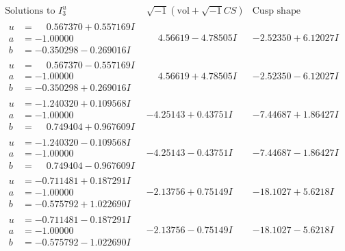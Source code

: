 \documentclass[1p]{elsarticle_modified}
\theoremstyle{definition}
\newcommand{\I}{\sqrt{-1}}
\begin{document}
$$\begin{array}{c|c|c}  
\text{Solutions to }I^u_{3}& \I (\text{vol} + \sqrt{-1}CS) & \text{Cusp shape}\\
 \hline 
\begin{aligned}
u &= \phantom{-}0.567370 + 0.557169 I \\
a &= -1.00000\phantom{ +0.000000I} \\
b &= -0.350298 - 0.269016 I\end{aligned}
 & \phantom{-}4.56619 - 4.78505 I & -2.52350 + 6.12027 I \\ \hline\begin{aligned}
u &= \phantom{-}0.567370 - 0.557169 I \\
a &= -1.00000\phantom{ +0.000000I} \\
b &= -0.350298 + 0.269016 I\end{aligned}
 & \phantom{-}4.56619 + 4.78505 I & -2.52350 - 6.12027 I \\ \hline\begin{aligned}
u &= -1.240320 + 0.109568 I \\
a &= -1.00000\phantom{ +0.000000I} \\
b &= \phantom{-}0.749404 + 0.967609 I\end{aligned}
 & -4.25143 + 0.43751 I & -7.44687 + 1.86427 I \\ \hline\begin{aligned}
u &= -1.240320 - 0.109568 I \\
a &= -1.00000\phantom{ +0.000000I} \\
b &= \phantom{-}0.749404 - 0.967609 I\end{aligned}
 & -4.25143 - 0.43751 I & -7.44687 - 1.86427 I \\ \hline\begin{aligned}
u &= -0.711481 + 0.187291 I \\
a &= -1.00000\phantom{ +0.000000I} \\
b &= -0.575792 + 1.022690 I\end{aligned}
 & -2.13756 + 0.75149 I & -18.1027 + 5.6218 I \\ \hline\begin{aligned}
u &= -0.711481 - 0.187291 I \\
a &= -1.00000\phantom{ +0.000000I} \\
b &= -0.575792 - 1.022690 I\end{aligned}
 & -2.13756 - 0.75149 I & -18.1027 - 5.6218 I \\ \hline\begin{aligned}

\end{aligned}
\end{array}$$
\end{document}
